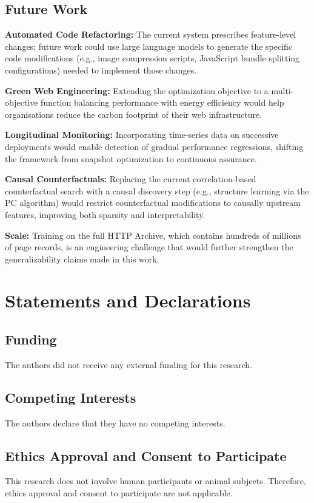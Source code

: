 \documentclass[sn-nature]{sn-jnl}
\begin{document}
\subsection{Future Work}

\textbf{Automated Code Refactoring:} The current system prescribes feature-level changes; future work could use large language models to generate the specific code modifications (e.g., image compression scripts, JavaScript bundle splitting configurations) needed to implement those changes.

\textbf{Green Web Engineering:} Extending the optimization objective to a multi-objective function balancing performance with energy efficiency would help organisations reduce the carbon footprint of their web infrastructure.

\textbf{Longitudinal Monitoring:} Incorporating time-series data on successive deployments would enable detection of gradual performance regressions, shifting the framework from snapshot optimization to continuous assurance.

\textbf{Causal Counterfactuals:} Replacing the current correlation-based counterfactual search with a causal discovery step (e.g., structure learning via the PC algorithm) would restrict counterfactual modifications to causally upstream features, improving both sparsity and interpretability.

\textbf{Scale:} Training on the full HTTP Archive, which contains hundreds of millions of page records, is an engineering challenge that would further strengthen the generalizability claims made in this work.



\section*{Statements and Declarations}

\subsection*{Funding}
The authors did not receive any external funding for this research.

\subsection*{Competing Interests}
The authors declare that they have no competing interests.

\subsection*{Ethics Approval and Consent to Participate}
This research does not involve human participants or animal subjects. Therefore, ethics approval and consent to participate are not applicable.
\end{document}
